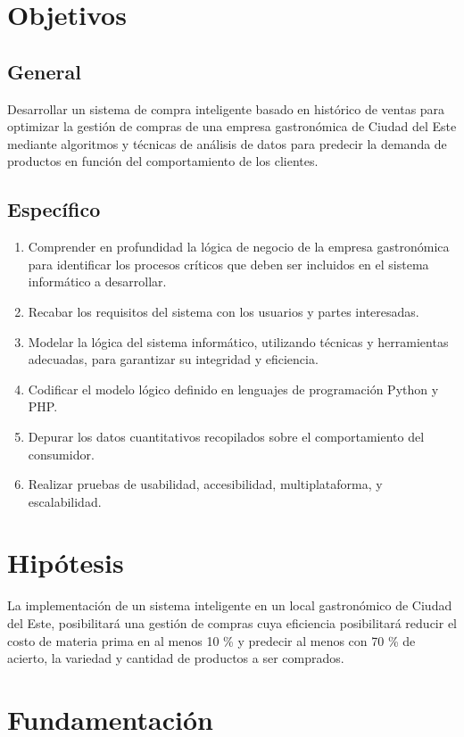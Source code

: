 \section{Objetivos}
\subsection{General}

Desarrollar un sistema de compra inteligente basado en histórico de ventas para optimizar la gestión de compras de una empresa gastronómica de Ciudad del Este mediante algoritmos y técnicas de análisis de datos para predecir la demanda de productos en función del comportamiento de los clientes.

\subsection{Específico}

\begin{enumerate}
\item  Comprender en profundidad la lógica de negocio de la empresa gastronómica para identificar los procesos críticos que deben ser incluidos en el sistema informático a desarrollar.
\item  Recabar los requisitos del sistema con los usuarios y partes interesadas.
\item  Modelar la lógica del sistema informático, utilizando técnicas y herramientas adecuadas, para garantizar su integridad y eficiencia.
\item  Codificar el modelo lógico definido en lenguajes de programación Python y PHP.
\item Depurar los datos cuantitativos recopilados sobre el comportamiento del consumidor.
\item  Realizar pruebas de usabilidad, accesibilidad, multiplataforma, y escalabilidad. 

\end{enumerate}
\section{Hipótesis}

La implementación de un sistema inteligente en un local gastronómico de Ciudad del Este, posibilitará una gestión de compras cuya eficiencia posibilitará reducir el costo de materia prima en al menos 10 \% y predecir al menos con 70 \% de acierto, la variedad y cantidad de productos a ser comprados.

\section{Fundamentación}


